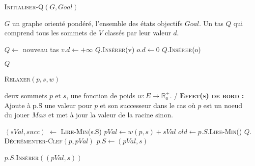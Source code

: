 

\begin{algorithm}
	\caption{\textsc {Initialiser-Q}$(G,Goal)$}
	 \label{algo:initQ}
	\begin{algorithmic}[1]
		\REQUIRE $G$ un graphe orienté pondéré, l'ensemble des états objectifs $Goal$.
		\ENSURE Un tas $Q$ qui comprend tous les sommets de $V$ classés par leur valeur $d$.
		
		\STATE $Q \leftarrow$ nouveau tas 
			\STATE $v.d \leftarrow +\infty$
			\STATE $Q.$\textsc{Insérer}(v)
		\ENDFOR
			\STATE $o.d \leftarrow 0$
			\STATE $Q.$\textsc{Insérer}(o)	
		\ENDFOR
		
		\RETURN $Q$
	
			
\end{algorithmic}
		
\end{algorithm}


\begin{algorithm}
	\caption{\textsc {Relaxer}$(p,s,w)$}
	 \label{algo:relaxerMinMax}
	\begin{algorithmic}[1]
		\REQUIRE deux sommets $p$ et $s$, une fonction de poids $w : E \rightarrow \mathbb{R}^{+}_{0}$.
		\ENSURE / \textbf{\textsc{Effet(s) de bord :}} Ajoute à p.S une valeur pour $p$ et son successeur dans le cas où
		$p$ est un noeud du jouer $\textit{Max}$ et met à jour la valeur de la racine sinon.
		
		\STATE $(sVal,succ)$ $\leftarrow$ \textsc{Lire-Min}(s.S) \label{lalgo:relaxer1}
		\STATE $pVal \leftarrow w(p,s) + sVal$	
		\STATE $old \leftarrow p.S.$\textsc{Lire-Min()} \label{lalgo:relaxer4}
		 \label{lalgo:relaxer5}
			\STATE $Q.$\textsc{Décrémenter-Clef}$(p,pVal)$ 
				\STATE $p.S \leftarrow (pVal,s)$
			\ENDIF 
		\ENDIF \label{lalgo:relaxer10}
		
		 \label{lalgo:relaxer11}
			\STATE $p.S.$\textsc{Insérer}$((pVal,s))$ 
		\ENDIF \label{lalgo:relaxer12}
			
\end{algorithmic}
		
\end{algorithm}


